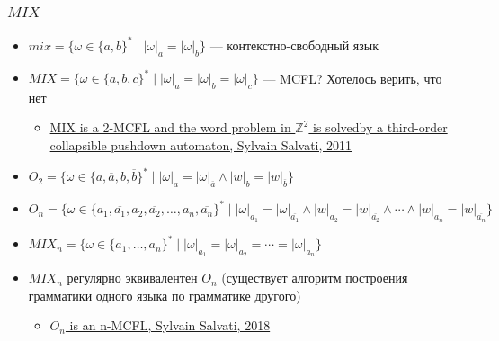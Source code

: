 \documentclass{beamer}
\begin{document}
\begin{frame}[fragile]

  \frametitle{$MIX$}
  \begin{itemize}
    \item $mix = \{\omega \in \{a,b\}^* \mid |\omega|_a = |\omega|_b \}$ --- контекстно-свободный язык

    \item $MIX = \{\omega \in \{a,b,c\}^* \mid |\omega|_a = |\omega|_b = |\omega|_c\}$ --- MCFL? Хотелось верить, что нет
    \begin{itemize}
      \item \href{https://hal.inria.fr/inria-00564552/document}{MIX is a 2-MCFL and the word problem in $\mathbb{Z}^2$ is solvedby a third-order collapsible pushdown automaton, Sylvain Salvati, 2011}
    \end{itemize}
    \pause
    \item $O_2=\{\omega \in \{a,\overline{a},b,\overline{b}\}^* \mid |\omega|_a=|\omega|_{\overline{a}} \wedge |w|_b=|w|_{\overline{b}}\}$

    \item $O_n=\{\omega \in \{a_1,\overline{a_1},a_2,\overline{a_2},\ldots,a_n,\overline{a_n}\}^* \mid |\omega|_{a_1}=|\omega|_{\overline{a_1}} \wedge |w|_{a_2}=|w|_{\overline{a_2}} \wedge \cdots \wedge |w|_{a_n}=|w|_{\overline{a_n}}\}$
    \item $MIX_n = \{\omega \in \{a_1,\ldots,a_n\}^* \mid |\omega|_{a_1} = |\omega|_{a_2} =\cdots = |\omega|_{a_n}\}$
    \pause
    \item $MIX_n$ регулярно эквивалентен $O_n$ (существует алгоритм построения грамматики одного языка по грамматике другого)
    \begin{itemize}
      \item \href{https://hal.archives-ouvertes.fr/hal-01771670/document}{$O_n$ is an n-MCFL, Sylvain Salvati, 2018}
    \end{itemize}
  \end{itemize}
\end{frame}
\end{document}
